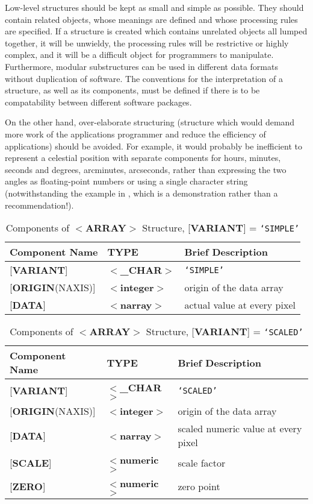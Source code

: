 \documentclass[twoside,11pt,nolof,noabs]{starlink}
\begin{document}
Low-level structures should be kept as small and simple as possible.
They should contain related objects, whose meanings are defined and
whose processing rules are specified.  If a
structure is created
which contains unrelated objects all lumped together, it
will be unwieldy, the
processing rules will be restrictive or highly complex, and it will
be a difficult object for programmers to manipulate.  Furthermore,
modular substructures can be used in different data formats without
duplication of software. The conventions for the interpretation of a
structure, as well as its components,
must be defined if there is to be compatability between
different software packages.

On the other hand, over-elaborate structuring (structure which would
demand more work of the applications programmer and reduce the
efficiency of applications) should be avoided.  For example, it
would probably be inefficient to represent a
celestial position with separate components for hours, minutes, seconds
and degrees, arcminutes, arcseconds, rather than expressing
the two angles as floating-point numbers or using
a single character string (notwithstanding the example in
, which is a demonstration rather than a recommendation!).

\begin{table}
\centering
\caption{Components of $<$\textbf{ARRAY}$>$ Structure,
{[}\textbf{VARIANT}{]} = \texttt{`SIMPLE'}}
\label{ta:example2}
\begin{tabular}{|l|l|l|}
\hline
Component Name  & TYPE & Brief Description \\ \hline
{[}\textbf{VARIANT}{]} & $<$\textbf{\_CHAR}$>$ & \texttt{`SIMPLE'} \\
{[}\textbf{ORIGIN}(NAXIS){]} & $<$\textbf{integer}$>$ & origin of the data array \\
{[}\textbf{DATA}{]} & $<$\textbf{narray}$>$ & actual value at every pixel \\ \hline
\end{tabular}
\end{table}

\begin{table}
\centering
\caption{Components of $<$\textbf{ARRAY}$>$ Structure,
{[}\textbf{VARIANT}{]} = \texttt{`SCALED'}}
\label{ta:example3}
\begin{tabular}{|l|l|l|}
\hline
Component Name & TYPE & Brief Description \\ \hline
{[}\textbf{VARIANT}{]} & $<$\textbf{\_CHAR}$>$ & \texttt{`SCALED'} \\
{[}\textbf{ORIGIN}(NAXIS){]} & $<$\textbf{integer}$>$ & origin of the data array \\
{[}\textbf{DATA}{]} & $<$\textbf{narray}$>$ & scaled numeric value at every pixel \\
{[}\textbf{SCALE}{]} & $<$\textbf{numeric}$>$ & scale factor \\
{[}\textbf{ZERO}{]} & $<$\textbf{numeric}$>$ & zero point \\ \hline
\end{tabular}
\end{table}
\end{document}
